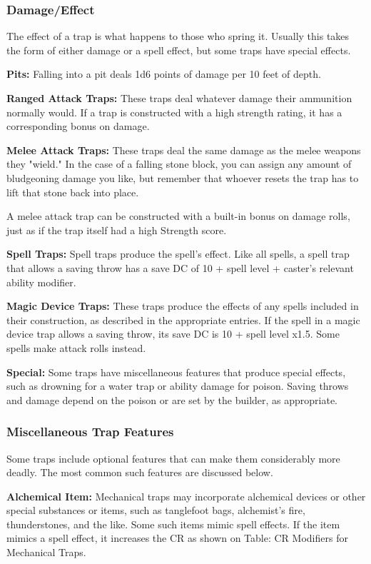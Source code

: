 \subsubsection{Damage/Effect}

The effect of a trap is what happens to those who spring it. Usually this takes 
the form of either damage or a spell effect, but some traps have special effects.

\textbf{Pits:} Falling into a pit deals 1d6 points of damage per 10 feet of depth. 

\textbf{Ranged Attack Traps:} These traps deal whatever damage their ammunition 
normally would. If a trap is constructed with a high strength rating, it has a 
corresponding bonus on damage.

\textbf{Melee Attack Traps:} These traps deal the same damage as the melee weapons 
they "wield." In the case of a falling stone block, you can assign any amount 
of bludgeoning damage you like, but remember that whoever resets the trap has to 
lift that stone back into place. 

A melee attack trap can be constructed with a built-in bonus on damage rolls, just 
as if the trap itself had a high Strength score. 

\textbf{Spell Traps:} Spell traps produce the spell's effect. Like all 
spells, a spell trap that allows a saving throw has a save DC of 10 + spell level 
+ caster's relevant ability modifier.

\textbf{Magic Device Traps:} These traps produce the effects of any spells included 
in their construction, as described in the appropriate entries. If the 
spell in a magic device trap allows a saving throw, its save DC is 10 + spell level 
x1.5. Some spells make attack rolls instead.

\textbf{Special:} Some traps have miscellaneous features that produce special effects, 
such as drowning for a water trap or ability damage for poison. Saving throws and 
damage depend on the poison or are set by the builder, as appropriate.

\subsubsection{Miscellaneous Trap Features}

Some traps include optional features that can make them considerably more deadly. 
The most common such features are discussed below.

\textbf{Alchemical Item:} Mechanical traps may incorporate alchemical devices or 
other special substances or items, such as tanglefoot bags, alchemist's fire, thunderstones, 
and the like. Some such items mimic spell effects. If the item mimics a spell effect, 
it increases the CR as shown on Table: CR Modifiers for Mechanical Traps.

